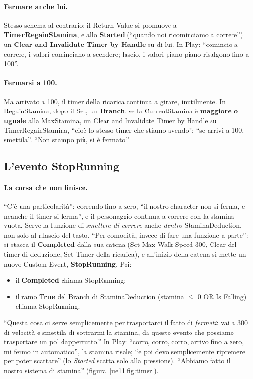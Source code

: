 \paragraph{Fermare anche lui.} Stesso schema al contrario: il Return Value si promuove a
\textbf{TimerRegainStamina}, e allo \textbf{Started} (``quando noi ricominciamo a
correre'') un \textbf{Clear and Invalidate Timer by Handle} su di lui. In Play: ``comincio a
correre, i valori cominciano a scendere; lascio, i valori piano piano risalgono fino a
100''.

\paragraph{Fermarsi a 100.} Ma arrivato a 100, il timer della ricarica continua a girare,
inutilmente. In RegainStamina, dopo il Set, un \textbf{Branch}: se la CurrentStamina è
\textbf{maggiore o uguale} alla MaxStamina, un Clear and Invalidate Timer by Handle su
TimerRegainStamina, ``cioè lo stesso timer che stiamo avendo'': ``se arrivi a 100,
smettila''. ``Non stampo più, si è fermato.''

\subsection{L'evento StopRunning}

\paragraph{La corsa che non finisce.} ``C'è una particolarità'': correndo fino a zero, ``il
nostro character non si ferma, e neanche il timer si ferma'', e il personaggio continua a
correre con la stamina vuota. Serve la funzione di \emph{smettere di correre} anche
\emph{dentro} StaminaDeduction, non solo al rilascio del tasto. ``Per comodità, invece di
fare una funzione a parte'': si stacca il \textbf{Completed} dalla sua catena (Set Max Walk
Speed 300, Clear del timer di deduzione, Set Timer della ricarica), e all'inizio della
catena si mette un nuovo Custom Event, \textbf{StopRunning}. Poi:
\begin{itemize}
  \item il \textbf{Completed} chiama StopRunning;
  \item il ramo \textbf{True} del Branch di StaminaDeduction (stamina $\le$ 0 OR Is
        Falling) chiama StopRunning.
\end{itemize}
``Questa cosa ci serve semplicemente per trasportarci il fatto di \emph{fermati}: vai a
300 di velocità e smettila di sottrarmi la stamina, da questo evento che possiamo
trasportare un po' dappertutto.'' In Play: ``corro, corro, corro, arrivo fino a zero, mi
fermo in automatico'', la stamina risale; ``e poi devo semplicemente ripremere per poter
scattare'' (lo \emph{Started} scatta solo alla pressione). ``Abbiamo fatto il nostro
sistema di stamina'' (figura~\ref{ue11:fig:timer}).

